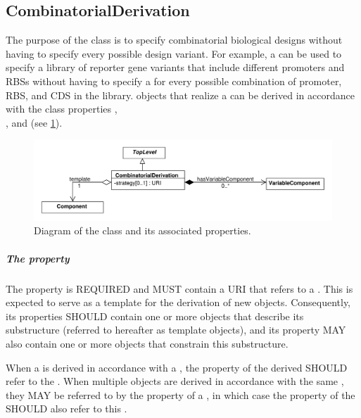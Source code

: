 \subsection{CombinatorialDerivation}
\label{sec:CombinatorialDerivation}

The purpose of the  class is to specify combinatorial biological designs without having to specify every possible design variant. For example, a  can be used to specify a library of reporter gene variants that include different promoters and RBSs without having to specify a  for every possible combination of promoter, RBS, and CDS in the library.  objects that realize a  can be derived in accordance with the class properties , \\
, and  (see \ref{uml:combinatorial_derivation}).

\begin{figure}[ht]
\begin{center}
\includegraphics[scale=0.6]{uml/combinatorial_derivation}
\caption[]{Diagram of the  class and its associated properties.}
\label{uml:combinatorial_derivation}
\end{center}
\end{figure}

\subparagraph{The  property}\label{sec:template}

The  property is REQUIRED and MUST contain a URI that refers to a . 
This  is expected to serve as a template for the derivation of new  objects. 
Consequently, its  properties SHOULD contain one or more  objects that describe its substructure (referred to hereafter as template  objects), and its  property MAY also contain one or more  objects that constrain this substructure.

When a  is derived in accordance with a , the  property of the derived  SHOULD refer to the . When multiple  objects are derived in accordance with the same , they MAY be referred to by the  property of a , in which case the  property of the  SHOULD also refer to this .

